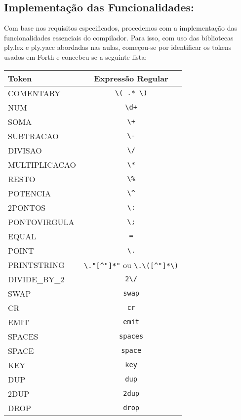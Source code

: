 \documentclass{article}
\begin{document}
    \subsection*{Implementação das Funcionalidades:} 
        
        \vspace{0.5cm}
        
        Com base nos requisitos especificados, procedemos com a implementação das funcionalidades essenciais do compilador. Para isso, com uso das bibliotecas ply.lex e ply.yacc abordadas nas aulas, começou-se por identificar os tokens usados em Forth e concebeu-se a seguinte lista:

\begin{center}
    \begin{tabular}{|l|c|}
    \hline
    \textbf{Token} & \textbf{Expressão Regular} \\
    \hline
        COMENTARY & \verb|\( .* \)| \\
        NUM & \verb|\d+| \\
        SOMA & \verb|\+| \\
        SUBTRACAO & \verb|\-| \\
        DIVISAO & \verb|\/| \\
        MULTIPLICACAO & \verb|\*| \\
        RESTO & \verb|\%| \\
        POTENCIA & \verb|\^| \\
        2PONTOS & \verb|\:| \\
        PONTOVIRGULA & \verb|\;| \\
        EQUAL & \verb|=| \\
        POINT & \verb|\.| \\
        PRINTSTRING & \verb|\."[^"]*"| ou \verb|\.\([^"]*\)| \\
        DIVIDE\_BY\_2 & \verb|2\/| \\
        SWAP & \verb|swap| \\
        CR & \verb|cr| \\
        EMIT & \verb|emit| \\
        SPACES & \verb|spaces| \\
        SPACE & \verb|space| \\
        KEY & \verb|key| \\
        DUP & \verb|dup| \\
        2DUP & \verb|2dup| \\
        DROP & \verb|drop| \\

\end{tabular}
\end{center}
\end{document}
